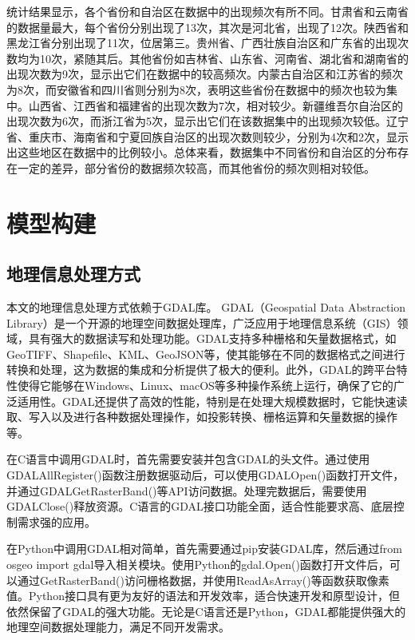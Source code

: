 \documentclass[AutoFakeBold]{LZUThesis-PgD&PhD}
\begin{document}
   统计结果显示，各个省份和自治区在数据中的出现频次有所不同。甘肃省和云南省的数据量最大，每个省份分别出现了13次，其次是河北省，出现了12次。陕西省和黑龙江省分别出现了11次，位居第三。贵州省、广西壮族自治区和广东省的出现次数均为10次，紧随其后。其他省份如吉林省、山东省、河南省、湖北省和湖南省的出现次数为9次，显示出它们在数据中的较高频次。内蒙古自治区和江苏省的频次为8次，而安徽省和四川省则分别为8次，表明这些省份在数据中的频次也较为集中。山西省、江西省和福建省的出现次数为7次，相对较少。新疆维吾尔自治区的出现次数为6次，而浙江省为5次，显示出它们在该数据集中的出现频次较低。辽宁省、重庆市、海南省和宁夏回族自治区的出现次数则较少，分别为4次和2次，显示出这些地区在数据中的比例较小。总体来看，数据集中不同省份和自治区的分布存在一定的差异，部分省份的数据频次较高，而其他省份的频次则相对较低。

\chapter{模型构建}

\section{地理信息处理方式}

本文的地理信息处理方式依赖于GDAL库。
GDAL（Geospatial Data Abstraction Library）是一个开源的地理空间数据处理库，广泛应用于地理信息系统（GIS）领域，具有强大的数据读写和处理功能。GDAL支持多种栅格和矢量数据格式，如GeoTIFF、Shapefile、KML、GeoJSON等，使其能够在不同的数据格式之间进行转换和处理，这为数据的集成和分析提供了极大的便利。此外，GDAL的跨平台特性使得它能够在Windows、Linux、macOS等多种操作系统上运行，确保了它的广泛适用性。GDAL还提供了高效的性能，特别是在处理大规模数据时，它能快速读取、写入以及进行各种数据处理操作，如投影转换、栅格运算和矢量数据的操作等。

在C语言中调用GDAL时，首先需要安装并包含GDAL的头文件。通过使用GDALAllRegister()函数注册数据驱动后，可以使用GDALOpen()函数打开文件，并通过GDALGetRasterBand()等API访问数据。处理完数据后，需要使用GDALClose()释放资源。C语言的GDAL接口功能全面，适合性能要求高、底层控制需求强的应用。

在Python中调用GDAL相对简单，首先需要通过pip安装GDAL库，然后通过from osgeo import gdal导入相关模块。使用Python的gdal.Open()函数打开文件后，可以通过GetRasterBand()访问栅格数据，并使用ReadAsArray()等函数获取像素值。Python接口具有更为友好的语法和开发效率，适合快速开发和原型设计，但依然保留了GDAL的强大功能。无论是C语言还是Python，GDAL都能提供强大的地理空间数据处理能力，满足不同开发需求。
\end{document}

